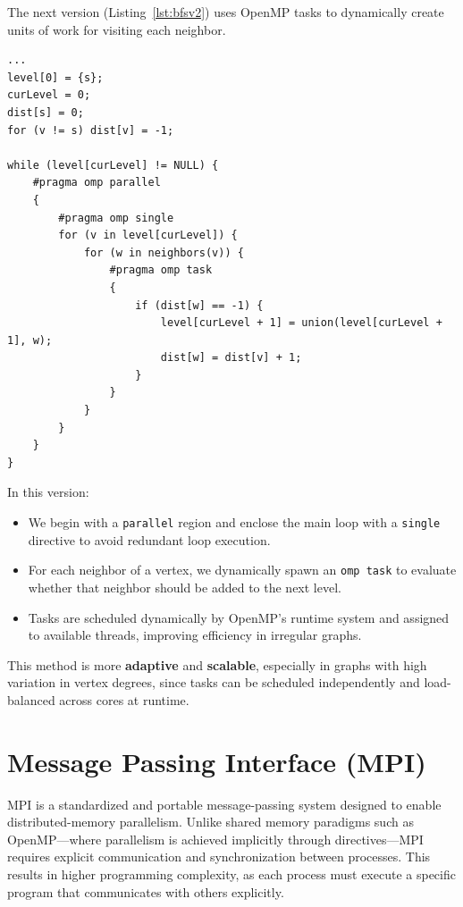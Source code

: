 \documentclass[12pt]{book}
\begin{document}
The next version (Listing~\ref{lst:bfsv2}) uses OpenMP tasks to dynamically create units of work for visiting each neighbor.

\begin{lstlisting}[style=cppstyle, caption={Parallel BFS using OpenMP tasks}, captionpos=b, label={lst:bfsv2}]
...
level[0] = {s};
curLevel = 0;
dist[s] = 0;
for (v != s) dist[v] = -1;

while (level[curLevel] != NULL) {
    #pragma omp parallel
    {
        #pragma omp single
        for (v in level[curLevel]) {
            for (w in neighbors(v)) {
                #pragma omp task
                {
                    if (dist[w] == -1) {
                        level[curLevel + 1] = union(level[curLevel + 1], w);
                        dist[w] = dist[v] + 1;
                    }
                }
            }
        }
    }
}
\end{lstlisting}

In this version:
\begin{itemize}
    \item We begin with a \texttt{parallel} region and enclose the main loop with a \texttt{single} directive to avoid redundant loop execution.
    \item For each neighbor of a vertex, we dynamically spawn an \texttt{omp task} to evaluate whether that neighbor should be added to the next level.
    \item Tasks are scheduled dynamically by OpenMP’s runtime system and assigned to available threads, improving efficiency in irregular graphs.
\end{itemize}

This method is more \textbf{adaptive} and \textbf{scalable}, especially in graphs with high variation in vertex degrees, since tasks can be scheduled independently and load-balanced across cores at runtime.


\chapter{Message Passing Interface (MPI)}

MPI is a standardized and portable message-passing system designed to enable distributed-memory parallelism. Unlike shared memory paradigms such as OpenMP—where parallelism is achieved implicitly through directives—MPI requires explicit communication and synchronization between processes. This results in higher programming complexity, as each process must execute a specific program that communicates with others explicitly.
\end{document}
